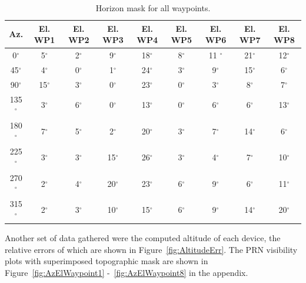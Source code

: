 \documentclass[]{aiaa-tc}%
\begin{document}
	\begin{table}[H]%
		\begin{center}
			\caption{Horizon mask for all waypoints.}
			\label{t:WaypointsHorMask}
			\begin{tabular}{c|c|c|c|c|c|c|c|c}
				Az. & El. WP1 & El. WP2 & El. WP3& El. WP4 & El. WP5 & El. WP6 & El. WP7 & El. WP8\\ \hline
				0$^{\circ}$  & 5$^{\circ}$ & 2$^{\circ}$ & 9$^{\circ}$ & 18$^{\circ}$ & 8$^{\circ}$& 11 $^{\circ}$& 21$^{\circ}$& 12$^{\circ}$ \\
				45$^{\circ}$ & 4$^{\circ}$ & 0$^{\circ}$ & 1$^{\circ}$ & 24$^{\circ}$ & 3$^{\circ}$& 9$^{\circ}$& 15$^{\circ}$& 6$^{\circ}$ \\
				90$^{\circ}$ & 15$^{\circ}$ & 3$^{\circ}$ & 0$^{\circ}$ & 23$^{\circ}$ & 0$^{\circ}$& 3$^{\circ}$& 8$^{\circ}$& 7$^{\circ}$ \\
				135$^{\circ}$ & 3$^{\circ}$ & 6$^{\circ}$ & 0$^{\circ}$ & 13$^{\circ}$ & 0$^{\circ}$& 6$^{\circ}$& 6$^{\circ}$& 13$^{\circ}$ \\
				180$^{\circ}$ & 7$^{\circ}$ & 5$^{\circ}$ & 2$^{\circ}$ &  20$^{\circ}$ & 3$^{\circ}$& 7$^{\circ}$& 14$^{\circ}$& 6$^{\circ}$ \\
				225$^{\circ}$ & 3$^{\circ}$ & 3$^{\circ}$ & 15$^{\circ}$ & 26$^{\circ}$ & 3$^{\circ}$& 4$^{\circ}$& 7$^{\circ}$& 10$^{\circ}$ \\
				270$^{\circ}$ & 2$^{\circ}$ & 4$^{\circ}$ & 20$^{\circ}$ & 23$^{\circ}$ & 6$^{\circ}$& 9$^{\circ}$& 6$^{\circ}$& 11$^{\circ}$ \\
				315$^{\circ}$ & 2$^{\circ}$ & 3$^{\circ}$ & 10$^{\circ}$ & 15$^{\circ}$ & 6$^{\circ}$& 9$^{\circ}$& 14$^{\circ}$& 20$^{\circ}$ \\
				
			\end{tabular}
		\end{center}
	\end{table}  
	
	\noindent Another set of data gathered were the computed altitude of each device, the relative errors of which are shown in Figure~\ref{fig:AltitudeErr}. The PRN visibility plots with superimposed topographic mask are shown in Figure~\ref{fig:AzElWaypoint1} -~\ref{fig:AzElWaypoint8} in the appendix.
	
\end{document}
